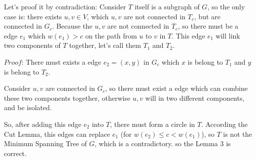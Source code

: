 Let's proof it by contradiction: Consider $T$ itself is a subgraph of $G$, so the only case is: there exists $u, v \in V$, which $u, v$ are not connected in $T_c$, but are connected in $G_c$. Because the $u, v$ are not connected in $T_c$, so there must be a edge $e_1$ which $w(e_1) > c$ on the path from $u$ to $v$ in $T$. This edge $e_1$ will link two components of $T$ together, let's call them $T_{1}$ and $T_{2}$.

$Proof$: There must exists a edge $e_2 = (x, y)$ in $G_{c}$ which $x$ is belong to $T_{1}$ and $y$ is belong to $T_{2}$.\par
Consider $u, v$ are connected in $G_{c}$, so there must exist a edge which can combine these two components together, otherwise $u, v$ will in two different components, and be isolated.

So, after adding this edge $e_2$ into $T$, there must form a circle in $T$. According the Cut Lemma, this edges can replace $e_1$ (for $w(e_2) \leq c < w(e_1)$), so $T$ is not the Minimum Spanning Tree of $G$, which is a contradictory. so the Lemma 3 is correct. 